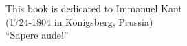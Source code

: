 
%
%
%

\thispagestyle{empty}
\vspace*{3.5cm}
\begin{flushright}

{\large This book is dedicated to Immanuel Kant\\
(1724-1804 in K\"onigsberg, Prussia)\\
``Sapere aude!''}

\end{flushright}



